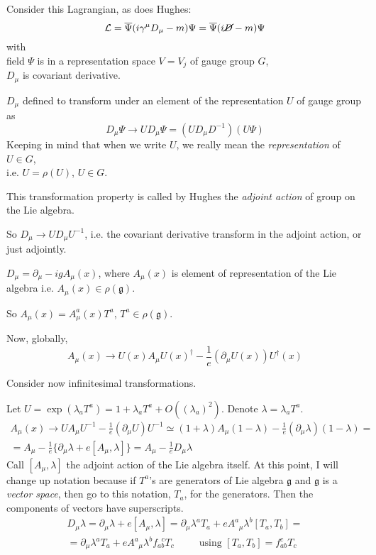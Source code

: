 \documentclass[10pt]{amsart}
\begin{document}
\begin{multicols}{2}
Consider this Lagrangian, as does Hughes:
\[
\mathcal{L} = \overline{\Psi} (i \gamma^{\mu} D_{\mu} - m ) \Psi = \overline{\Psi} (i \cancel{D} - m ) \Psi
\]
with \\
field $\Psi$ is in a representation space $V=V_j$ of gauge group $G$,  \\
$D_{\mu}$ is covariant derivative.

$D_{\mu}$ defined to transform under an element of the representation $U$ of gauge group as 
\[
D_{\mu} \Psi \to U D_{\mu} \Psi = (UD_{\mu} D^{-1})(U\Psi)
\]
Keeping in mind that when we write $U$, we really mean the \emph{representation} of $U \in G$, \\
i.e. $U=\rho(U)$, $U\in G$.

This transformation property is called by Hughes the \emph{adjoint action} of group on the Lie algebra.  

So $D_{\mu} \to UD_{\mu} U^{-1}$, i.e. the covariant derivative transform in the adjoint action, or just adjointly.  

$D_{\mu} = \partial_{\mu} - igA_{\mu}(x)$, where $A_{\mu}(x)$ is element of representation of the Lie algebra i.e. $A_{\mu}(x) \in \rho(\mathfrak{g})$.  

So $A_{\mu}(x) = A_{\mu}^a(x)T^a$, $T^a\in \rho(\mathfrak{g})$.  

Now, globally,
\[
A_{\mu}(x) \to U(x) A_{\mu}U(x)^{\dag} - \frac{1}{e} (\partial_{\mu} U(x))U^{\dag}(x)
\]

Consider now infinitesimal transformations.  

Let $U=\exp{ (\lambda_a T^a)} = 1 + \lambda_aT^a + O((\lambda_a)^2)$.  Denote $\lambda = \lambda_aT^a$.  
\[
\begin{gathered}
  A_{\mu}(x) \to UA_{\mu} U^{-1} - \frac{1}{e} (\partial_{\mu} U) U^{-1} \simeq (1+\lambda)A_{\mu}(1-\lambda) - \frac{1}{e} (\partial_{\mu} \lambda) (1-\lambda) = \\
  = A_{\mu} - \frac{1}{e} \lbrace  \partial_{\mu} \lambda + e[A_{\mu}, \lambda] \rbrace = A_{\mu} - \frac{1}{e} D_{\mu} \lambda
\end{gathered}
\]
Call $[A_{\mu}, \lambda]$ the adjoint action of the Lie algebra itself.  
At this point, I will change up notation because if $T^a$'s are generators of Lie algebra $\mathfrak{g}$ and $\mathfrak{g}$ is a \emph{vector space}, then go to this notation, $T_a$, for the generators.  Then the components of vectors have superscripts.  
\[
\begin{gathered}
  D_{\mu} \lambda = \partial_{\mu} \lambda + e[A_{\mu},\lambda ] = \partial_{\mu} \lambda^a T_a + eA^a_{ \; \; \mu} \lambda^b[T_a,T_b] = \\
  = \partial_{\mu} \lambda^a T_a + eA^a_{ \; \; \mu} \lambda^b f_{ab}^{ \; \; c} T_c \qquad \, \text{ using } [T_a,T_b] = f_{ab}^c T_c
\end{gathered}
\]


\end{multicols}
\end{document}
